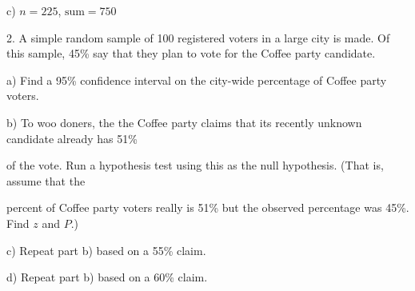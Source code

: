 \documentclass[10pt]{article}
\begin{document}
\hspace{20pt} c) $n=225$, $\mbox{sum}=750$
\vfill
\eject


2. A simple random sample of 100 registered voters in a large city is made.  
Of this sample, 45\% say that they plan to vote for the Coffee party candidate.

\hspace{20pt} a) Find a 95\% confidence interval on the city-wide percentage of 
  Coffee party voters.
\vspace{1.75in}

\hspace{20pt} b) To woo doners, the the Coffee party claims that its recently
  unknown candidate already has 51\%\vspace{-5pt}

\HH of the vote.  Run a hypothesis test
  using this as the null hypothesis. (That is, assume that the \vspace{-5pt}

\HH percent of Coffee party
voters really is 51\% but the observed percentage was 45\%.  Find $z$ and $P$.)
 \vspace{2.2in}

\hspace{20pt} c) Repeat part b) based on a 55\% claim.
 \vspace{2.2in}

\hspace{20pt} d) Repeat part b) based on a 60\% claim.
\vfill
\eject
\end{document}
